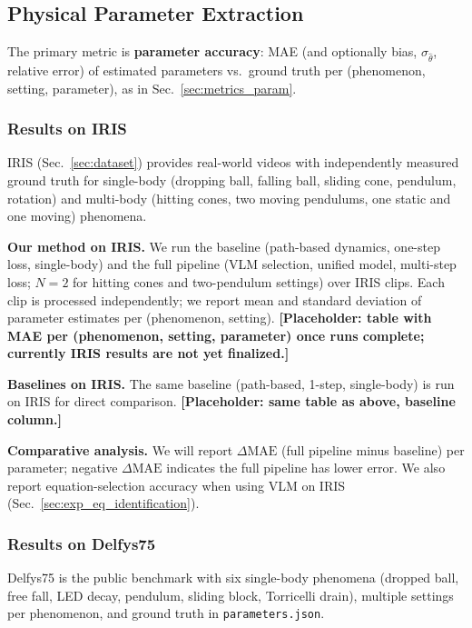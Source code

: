 \subsection{Physical Parameter Extraction}
\label{sec:exp_phys_extraction}

The primary metric is \textbf{parameter accuracy}: MAE (and optionally bias, $\sigma_{\hat{\theta}}$, relative error) of estimated parameters vs.\ ground truth per (phenomenon, setting, parameter), as in Sec.~\ref{sec:metrics_param}.

\subsubsection{Results on IRIS}
\label{sec:exp_iris}

IRIS (Sec.~\ref{sec:dataset}) provides real-world videos with independently measured ground truth for single-body (dropping ball, falling ball, sliding cone, pendulum, rotation) and multi-body (hitting cones, two moving pendulums, one static and one moving) phenomena.

\textbf{Our method on IRIS.} We run the baseline (path-based dynamics, one-step loss, single-body) and the full pipeline (VLM selection, unified model, multi-step loss; $N=2$ for hitting cones and two-pendulum settings) over IRIS clips. Each clip is processed independently; we report mean and standard deviation of parameter estimates per (phenomenon, setting). \textbf{[Placeholder: table with MAE per (phenomenon, setting, parameter) once runs complete; currently IRIS results are not yet finalized.]}

\textbf{Baselines on IRIS.} The same baseline (path-based, 1-step, single-body) is run on IRIS for direct comparison. \textbf{[Placeholder: same table as above, baseline column.]}

\textbf{Comparative analysis.} We will report $\Delta\mathrm{MAE}$ (full pipeline minus baseline) per parameter; negative $\Delta\mathrm{MAE}$ indicates the full pipeline has lower error. We also report equation-selection accuracy when using VLM on IRIS (Sec.~\ref{sec:exp_eq_identification}).

\subsubsection{Results on Delfys75}
\label{sec:exp_delfys}

Delfys75 is the public benchmark with six single-body phenomena (dropped ball, free fall, LED decay, pendulum, sliding block, Torricelli drain), multiple settings per phenomenon, and ground truth in \texttt{parameters.json}.


